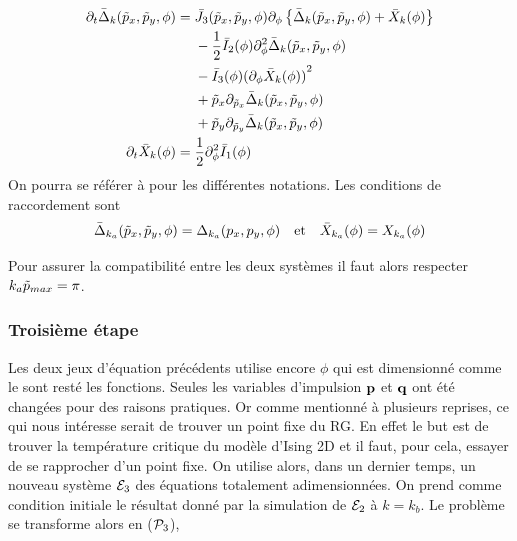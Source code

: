 \documentclass[10.5pt]{article}
\begin{document}
\begin{multicols}{2}
\begin{align}
	\partial_t  \bar{\Delta}_k (\tilde{p}_x, \tilde{p}_y, \phi) & = 
	\begin{aligned}[t]
	&  \bar{J}_3(\tilde{p}_x, \tilde{p}_y, \phi) \partial_{\phi} \left\{ \bar{\Delta}_k (\tilde{p}_x, \tilde{p}_y, \phi) + \bar{X}_k(\phi) \right\} \\
	&  - \frac{1}{2} \bar{I}_2(\phi) \partial_{\phi}^2 \bar{\Delta}_k(\tilde{p}_x, \tilde{p}_y, \phi) \\
	& - \bar{I}_3(\phi){(\partial_{\phi} \bar{X}_k(\phi))}^2 \\
	& + \tilde{p}_x \partial_{\tilde{p}_x} \bar{\Delta}_k (\tilde{p}_x, \tilde{p}_y, \phi)  \\
	& + \tilde{p}_y \partial_{\tilde{p}_y}  \bar{\Delta}_k (\tilde{p}_x, \tilde{p}_y, \phi) 
	\end{aligned}
	\label{eqn} \\
	\partial_t \bar{X}_k(\phi) & = 
	\begin{aligned}[t]
		& \frac{1}{2} \partial_{\phi}^2 \bar{I}_1(\phi)
	\end{aligned}
\end{align}
On pourra se référer à  pour les différentes notations. Les conditions de raccordement sont
\begin{equation*}
\bar{\Delta}_{k_a}(\tilde{p}_x, \tilde{p}_y, \phi) = \Delta_{k_a}(p_x, p_y, \phi) \quad \text{et} \quad \bar{X}_{k_a}(\phi) = X_{k_a}(\phi)
\end{equation*}

Pour assurer la compatibilité entre les deux systèmes il faut alors respecter $k_a\tilde{p}_{max} = \pi$. \\




\subsubsection{Troisième étape}

Les deux jeux d'équation précédents utilise encore $\phi$ qui est dimensionné comme le sont resté les fonctions. Seules les variables d'impulsion ${\bf p}$ et ${\bf q}$ ont été changées pour des raisons pratiques. Or comme mentionné à plusieurs reprises, ce qui nous intéresse serait de trouver un point fixe du RG. En effet le but est de trouver la température critique du modèle d'Ising 2D et il faut, pour cela, essayer de se rapprocher d'un point fixe. On utilise alors, dans un dernier temps, un nouveau système $\mathcal{E}_3$ des équations totalement adimensionnées. On prend comme condition initiale le résultat donné par la simulation de $\mathcal{E}_2$ à $k = k_b$. Le problème se transforme alors en ($\mathcal{P}_3$), \\


\end{multicols}
\end{document}
